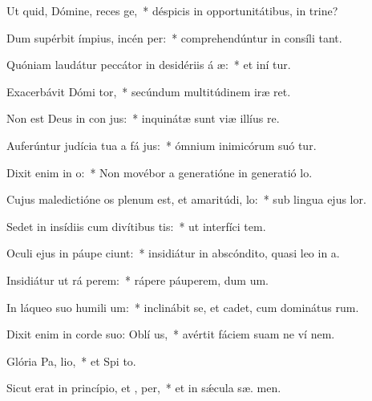 \item Ut quid, Dómine, reces ge,~* déspicis in opportunitátibus, in trine?
\item Dum supérbit ímpius, incén per:~* comprehendúntur in consíli  tant.
\item Quóniam laudátur peccátor in desidériis á æ:~* et iní tur.
\item Exacerbávit Dómi tor,~* secúndum multitúdinem iræ   ret.
\item Non est Deus in con jus:~* inquinátæ sunt viæ illíus   re.
\item Auferúntur judícia tua a fá jus:~* ómnium inimicórum suó tur.
\item Dixit enim in  o:~* Non movébor a generatióne in generatió  lo.
\item Cujus maledictióne os plenum est, et amaritúdi,  lo:~* sub lingua ejus   lor.
\item Sedet in insídiis cum divítibus  tis:~* ut interfíci tem.
\item Oculi ejus in páupe ciunt:~* insidiátur in abscóndito, quasi leo in  a.
\item Insidiátur ut rá perem:~* rápere páuperem, dum  um.
\item In láqueo suo humili um:~* inclinábit se, et cadet, cum dominátus  rum.
\item Dixit enim in corde suo: Oblí  us,~* avértit fáciem suam ne ví  nem.
\item Glória Pa,  lio,~* et Spi to.
\item Sicut erat in princípio, et ,  per,~* et in sǽcula sæ. men.
